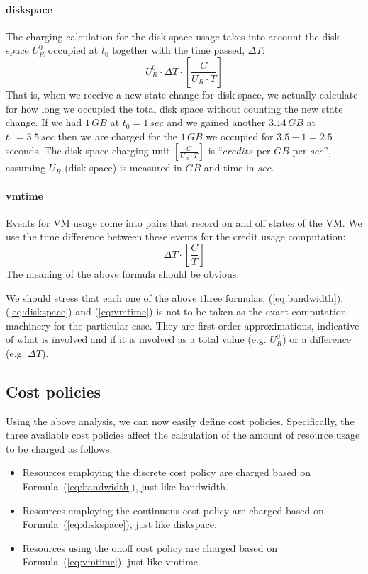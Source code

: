 \documentclass[preprint,10pt]{sigplanconf}
\newcommand{\GB}[1]{\ensuremath{#1\,GB}}
\newcommand{\secs}[1]{\ensuremath{#1\,sec}}
\begin{document}
\paragraph{\textsf{diskspace}}
The charging calculation for the disk space usage takes into account the disk space $U_R^0$ occupied at $t_0$ together with the time passed, $\Delta T$:
\begin{equation}
\label{eq:diskspace}
U_R^{0} \cdot \Delta T \cdot [ \frac{C}{U_R \cdot T} ]
\end{equation}
That is, when we receive a new state change for disk space, we actually calculate for how long we occupied the total disk space without counting the new state change. If we had \GB{1} at $t_0 = \secs{1}$ and we gained another \GB{3.14} at $t_1 = \secs{3.5}$ then we are charged for the \GB{1} we occupied for $3.5 - 1 = 2.5$ seconds. The disk space charging unit $[ \frac{C}{U_R \cdot T} ]$ is ``$credits$ per $GB$ per $sec$'', assuming $U_R$ (disk space) is measured in $GB$ and time in $sec$.


\paragraph{\textsf{vmtime}}
Events for VM usage come into pairs that record \textsf{on} and \textsf{off} states of the VM. We use the time difference between these events for the credit usage computation:
\begin{equation}
\label{eq:vmtime}
\Delta T \cdot [ \frac{C}{T} ]
\end{equation}
The meaning of the above formula should be obvious.

We should stress that each one of the above three formulas, (\ref{eq:bandwidth}), (\ref{eq:diskspace}) and (\ref{eq:vmtime}) is not to be taken as the exact computation machinery for the particular case. They are first-order approximations, indicative of what is involved and if it is involved as a total value (e.g. $U_R^0$) or a difference (e.g. $\Delta T$).


\subsection{Cost policies}
Using the above analysis, we can now easily define cost policies. Specifically, the three available cost policies affect the calculation 
of the amount of resource usage to be charged as follows:

\begin{itemize}
    \item Resources employing the \textsf{discrete} cost policy  are charged based on Formula~(\ref{eq:bandwidth}), just like \textsf{bandwidth}. 

    \item Resources employing the \textsf{continuous} cost policy are charged based on Formula~(\ref{eq:diskspace}), just like \textsf{diskspace}.

    \item Resources using the \textsf{onoff} cost policy are charged based on Formula~(\ref{eq:vmtime}), just like \textsf{vmtime}.
\end{itemize}
\end{document}
